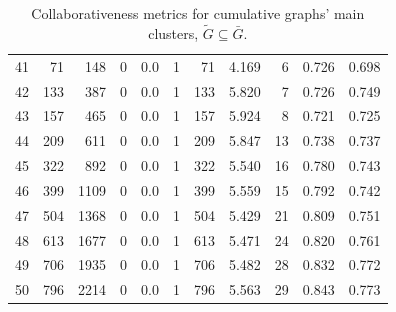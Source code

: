 \documentclass{article}
\theoremstyle{definition}
\begin{document}
\begin{table}[!hbtp]
{\begin{tabular}{lrrrrrrrrrr}
            41 &       71 &      148 &                 0 &               0.0 &                       1 &                         71 &       4.169 &              6 &       0.726 &             0.698 \\
            42 &      133 &      387 &                 0 &               0.0 &                       1 &                        133 &       5.820 &              7 &       0.726 &             0.749 \\
            43 &      157 &      465 &                 0 &               0.0 &                       1 &                        157 &       5.924 &              8 &       0.721 &             0.725 \\
            44 &      209 &      611 &                 0 &               0.0 &                       1 &                        209 &       5.847 &             13 &       0.738 &             0.737 \\
            45 &      322 &      892 &                 0 &               0.0 &                       1 &                        322 &       5.540 &             16 &       0.780 &             0.743 \\
            46 &      399 &     1109 &                 0 &               0.0 &                       1 &                        399 &       5.559 &             15 &       0.792 &             0.742 \\
            47 &      504 &     1368 &                 0 &               0.0 &                       1 &                        504 &       5.429 &             21 &       0.809 &             0.751 \\
            48 &      613 &     1677 &                 0 &               0.0 &                       1 &                        613 &       5.471 &             24 &       0.820 &             0.761 \\
            49 &      706 &     1935 &                 0 &               0.0 &                       1 &                        706 &       5.482 &             28 &       0.832 &             0.772 \\
            50 &      796 &     2214 &                 0 &               0.0 &                       1 &                        796 &       5.563 &             29 &       0.843 &             0.773 \\
            \bottomrule
            \end{tabular}
            }
    \caption{Collaborativeness metrics for cumulative graphs' main clusters, \(\tilde{G} \subseteq \bar{G}\).}
\end{table}
\end{document}
